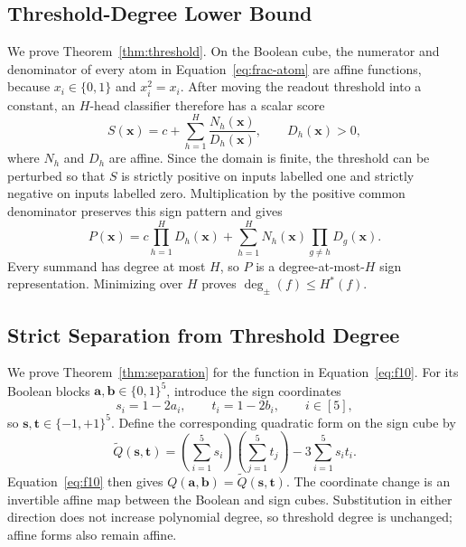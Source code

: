 \documentclass{article}
\theoremstyle{definition}
\theoremstyle{plain}
\newcommand{\hstar}{H^{\ast}}
\newcommand{\tdeg}{\deg_{\pm}}
\newcommand{\bits}{\{0,1\}}
\begin{document}
\subsection{Threshold-Degree Lower Bound}
\label{app:proof-threshold}

We prove Theorem~\ref{thm:threshold}. On the Boolean cube, the numerator and denominator of every atom in Equation~\eqref{eq:frac-atom} are affine functions, because $x_i\in\{0,1\}$ and $x_i^2=x_i$. After moving the readout threshold into a constant, an $H$-head classifier therefore has a scalar score
\begin{equation}
S(\mathbf{x})=c+\sum_{h=1}^{H}\frac{N_h(\mathbf{x})}{D_h(\mathbf{x})},
\qquad D_h(\mathbf{x})>0,
\label{eq:appendix-rational-score}
\end{equation}
where $N_h$ and $D_h$ are affine. Since the domain is finite, the threshold can be perturbed so that $S$ is strictly positive on inputs labelled one and strictly negative on inputs labelled zero. Multiplication by the positive common denominator preserves this sign pattern and gives
\begin{equation}
P(\mathbf{x})=
c\prod_{h=1}^{H}D_h(\mathbf{x})+
\sum_{h=1}^{H}N_h(\mathbf{x})\prod_{g\neq h}D_g(\mathbf{x}).
\label{eq:appendix-cleared-score}
\end{equation}
Every summand has degree at most $H$, so $P$ is a degree-at-most-$H$ sign representation. Minimizing over $H$ proves $\tdeg(f)\leq\hstar(f)$.

\subsection{Strict Separation from Threshold Degree}
\label{app:proof-separation}

We prove Theorem~\ref{thm:separation} for the function in Equation~\eqref{eq:f10}. For its Boolean blocks $\mathbf{a},\mathbf{b}\in\bits^5$, introduce the sign coordinates
\begin{equation}
s_i=1-2a_i,
\qquad
t_i=1-2b_i,
\qquad i\in[5],
\label{eq:f10-sign-coordinates}
\end{equation}
so $\mathbf{s},\mathbf{t}\in\{-1,+1\}^5$. Define the corresponding quadratic form on the sign cube by
\begin{equation}
\widetilde Q(\mathbf{s},\mathbf{t})=
\left(\sum_{i=1}^{5}s_i\right)\left(\sum_{j=1}^{5}t_j\right)
-3\sum_{i=1}^{5}s_it_i.
\label{eq:f10-signed-form}
\end{equation}
Equation~\eqref{eq:f10} then gives $Q(\mathbf{a},\mathbf{b})=\widetilde Q(\mathbf{s},\mathbf{t})$. The coordinate change is an invertible affine map between the Boolean and sign cubes. Substitution in either direction does not increase polynomial degree, so threshold degree is unchanged; affine forms also remain affine.
\end{document}
